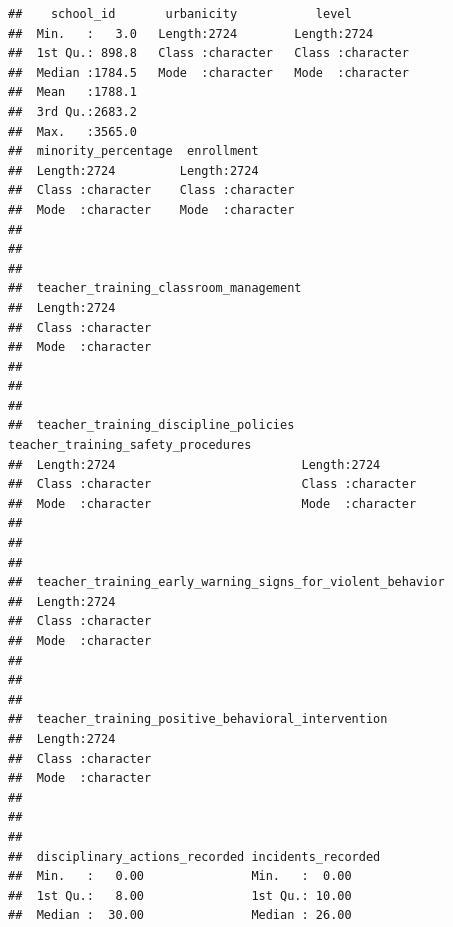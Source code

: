 \documentclass[man]{apa6}
\begin{document}
\begin{verbatim}
##    school_id       urbanicity           level          
##  Min.   :   3.0   Length:2724        Length:2724       
##  1st Qu.: 898.8   Class :character   Class :character  
##  Median :1784.5   Mode  :character   Mode  :character  
##  Mean   :1788.1                                        
##  3rd Qu.:2683.2                                        
##  Max.   :3565.0                                        
##  minority_percentage  enrollment       
##  Length:2724         Length:2724       
##  Class :character    Class :character  
##  Mode  :character    Mode  :character  
##                                        
##                                        
##                                        
##  teacher_training_classroom_management
##  Length:2724                          
##  Class :character                     
##  Mode  :character                     
##                                       
##                                       
##                                       
##  teacher_training_discipline_policies teacher_training_safety_procedures
##  Length:2724                          Length:2724                       
##  Class :character                     Class :character                  
##  Mode  :character                     Mode  :character                  
##                                                                         
##                                                                         
##                                                                         
##  teacher_training_early_warning_signs_for_violent_behavior
##  Length:2724                                              
##  Class :character                                         
##  Mode  :character                                         
##                                                           
##                                                           
##                                                           
##  teacher_training_positive_behavioral_intervention
##  Length:2724                                      
##  Class :character                                 
##  Mode  :character                                 
##                                                   
##                                                   
##                                                   
##  disciplinary_actions_recorded incidents_recorded
##  Min.   :   0.00               Min.   :  0.00    
##  1st Qu.:   8.00               1st Qu.: 10.00    
##  Median :  30.00               Median : 26.00    

\end{verbatim}
\end{document}
